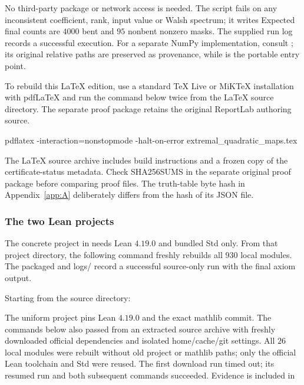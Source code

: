 \documentclass[11pt,a4paper]{article}
\theoremstyle{definition}
\begin{document}
No third-party package or network access is needed. The script fails on any inconsistent coefficient, rank, input value or Walsh spectrum; it writes  Expected final counts are $4000$ bent and $95$ nonbent nonzero masks. The supplied run log records a successful execution. For a separate NumPy implementation, consult ; its original relative paths are preserved as provenance, while  is the portable entry point.


To rebuild this LaTeX edition, use a standard TeX Live or MiKTeX installation with pdfLaTeX and run the command below twice from the LaTeX source directory. The separate proof package retains the original ReportLab authoring source.


\begin{Code}
pdflatex -interaction=nonstopmode -halt-on-error extremal_quadratic_maps.tex
\end{Code}

The LaTeX source archive includes build instructions and a frozen copy of the certificate-status metadata. Check SHA256SUMS in the separate original proof package before comparing proof files. The truth-table byte hash in Appendix~\ref{app:A} deliberately differs from the hash of its JSON file.


\subsubsection*{The two Lean projects}

The concrete project in  needs Lean $4.19.0$ and bundled Std only. From that project directory, the following command freshly rebuilds all $930$ local modules. The packaged  and logs/ record a successful source-only run with the final axiom output.


Starting from the source directory:



The uniform project pins Lean $4.19.0$ and the exact mathlib commit. The commands below also passed from an extracted source archive with freshly downloaded official dependencies and isolated home/cache/git settings. All $26$ local modules were rebuilt without old project or mathlib paths; only the official Lean toolchain and Std were reused. The first download run timed out; its resumed run and both subsequent commands succeeded. Evidence is included in 
\end{document}
